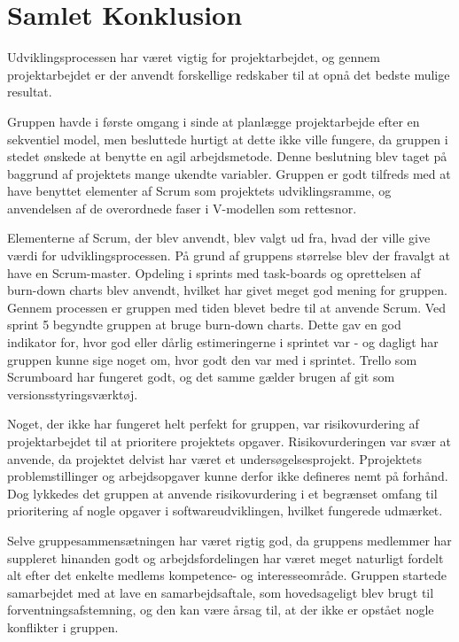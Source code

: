 \chapter{Samlet Konklusion}\label{SamletKonklusion}
Udviklingsprocessen har været vigtig for projektarbejdet, og gennem projektarbejdet er der anvendt forskellige redskaber til at opnå det bedste mulige resultat. 

Gruppen havde i første omgang i sinde at planlægge projektarbejde efter en sekventiel model, men besluttede hurtigt at dette ikke ville fungere, da gruppen i stedet ønskede at benytte en agil arbejdsmetode. Denne beslutning blev taget på baggrund af projektets mange ukendte variabler. Gruppen er godt tilfreds med at have benyttet elementer af Scrum som projektets udviklingsramme, og anvendelsen af de overordnede faser i V-modellen som rettesnor.

Elementerne af Scrum, der blev anvendt, blev valgt ud fra, hvad der ville give værdi for udviklingsprocessen. På grund af gruppens størrelse blev der fravalgt at have en Scrum-master. Opdeling i sprints med task-boards og oprettelsen af burn-down charts blev anvendt, hvilket har givet meget god mening for gruppen. Gennem processen er gruppen med tiden blevet bedre til at anvende Scrum. Ved sprint 5 begyndte gruppen at bruge burn-down charts. Dette gav en god indikator for, hvor god eller dårlig estimeringerne i sprintet var - og dagligt har gruppen kunne sige noget om, hvor godt den var med i sprintet. Trello som Scrumboard har fungeret godt, og det samme gælder brugen af git som versionsstyringsværktøj.

Noget, der ikke har fungeret helt perfekt for gruppen, var risikovurdering af projektarbejdet til at prioritere projektets opgaver. Risikovurderingen var svær at anvende, da projektet delvist har været et undersøgelsesprojekt. Pprojektets problemstillinger og arbejdsopgaver kunne derfor ikke defineres nemt på forhånd. Dog lykkedes det gruppen at anvende risikovurdering i et begrænset omfang til prioritering af nogle opgaver i softwareudviklingen, hvilket fungerede udmærket. 

Selve gruppesammensætningen har været rigtig god, da gruppens medlemmer har suppleret hinanden godt og arbejdsfordelingen har været meget naturligt fordelt alt efter det enkelte medlems kompetence- og interesseområde. Gruppen startede samarbejdet med at lave en samarbejdsaftale, som hovedsageligt blev brugt til forventningsafstemning, og den kan være årsag til, at der ikke er opstået nogle konflikter i gruppen. 
